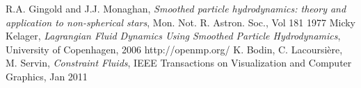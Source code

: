 \documentclass[a4paper,12pt,oneside,final]{extarticle}
\begin{document}


\clearpage

\begin{thebibliography}{9}
  
  R.A. Gingold and J.J. Monaghan, \emph{Smoothed particle hydrodynamics: theory and application to non-spherical stars}, Mon. Not. R. Astron. Soc., Vol 181 1977
  Micky Kelager, \emph{Lagrangian Fluid Dynamics Using Smoothed Particle Hydrodynamics}, University of Copenhagen, 2006
  http://openmp.org/
   K. Bodin, C. Lacoursière, M. Servin, \emph{Constraint Fluids}, IEEE Transactions on Visualization and Computer Graphics, Jan 2011 
\end{thebibliography}
\end{document}
